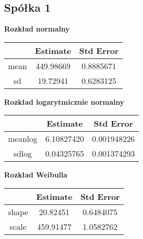 \documentclass[a4paper,11pt]{article}
\begin{document}
\subsection{Spółka 1}



\begin{center}
{\textbf{Rozkład normalny}}\\
\begin{tabular}{ |c | c | c|  } 
  \hline
    & Estimate & Std Error  \\ 
  \hline
  mean & 449.98669   &  0.8885671\\ 
  \hline
   sd &  19.72941    & 0.6283125 \\ 
  \hline
\end{tabular}




\end{center}

\begin{center} 
{\textbf{Rozkład logarytmicznie normalny}}\\

\begin{tabular}{ |c | c | c|  } 
  \hline
    & Estimate & Std Error  \\ 
  \hline
  meanlog & 6.10827420  &  0.001948226\\ 
  \hline
   sdlog &  0.04325765    &  0.001374293 \\ 
  \hline
\end{tabular}
\end{center}


\begin{center} 
{\textbf{Rozkład Weibulla}}\\
\begin{tabular}{ |c | c | c|  } 
  \hline
    & Estimate & Std Error  \\ 
  \hline
  shape & 20.82451 &  0.6484075\\ 
  \hline
   scale &  459.91477    &  1.0582762 \\ 
  \hline
\end{tabular}
\end{center}
\end{document}

